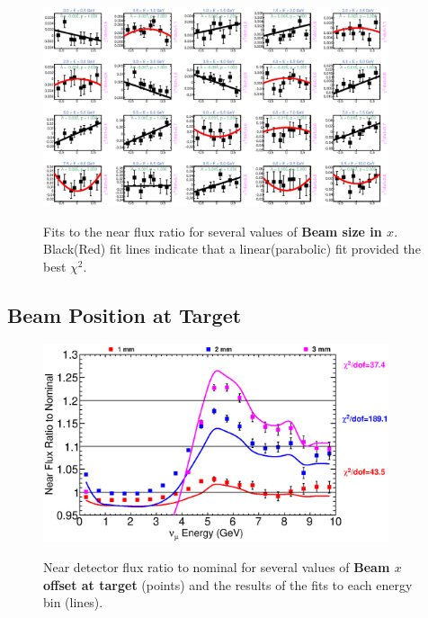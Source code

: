 \begin{figure}[hb]
  \begin{center}
    {\includegraphics[width=4.0in]{figures/BeamSigmaY_near_fits.eps}}
  \end{center}
\caption{ Fits to the near flux ratio for several values of {\bf Beam size in $x$}. Black(Red) fit lines indicate that a linear(parabolic) fit provided the best $\chi^2$. }
\end{figure}

\subsection{Beam Position at Target}

\begin{figure}[ht]
  \begin{center}
    {\includegraphics[width=4.0in]{figures/NominalX_near_summary.eps}}
  \end{center}
\caption{ Near detector flux ratio to nominal for several values of {\bf Beam $x$ offset at target} (points) and the results of the fits to each energy bin (lines).}
\end{figure}

